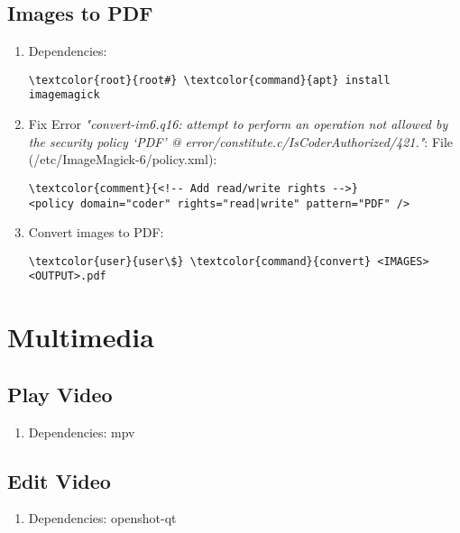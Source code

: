 \documentclass[10pt, a4paper, onecolumn, openany]{book} %
\begin{document}
\subsection{Images to PDF}
\begin{enumerate}
    \item Dependencies:
\begin{Verbatim}[commandchars=\\\{\}]
\textcolor{root}{root#} \textcolor{command}{apt} install imagemagick
\end{Verbatim}
    \item Fix Error \textit{"convert-im6.q16: attempt to perform an operation not allowed by the security policy `PDF' @ error/constitute.c/IsCoderAuthorized/421."}:
\newline File (\textcolor{file}{/etc/ImageMagick-6/policy.xml}):
\begin{Verbatim}[commandchars=\\\{\}]
\textcolor{comment}{<!-- Add read/write rights -->}
<policy domain="coder" rights="read|write" pattern="PDF" />
\end{Verbatim}
    \item Convert images to PDF:
\begin{Verbatim}[commandchars=\\\{\}]
\textcolor{user}{user\$} \textcolor{command}{convert} <IMAGES> <OUTPUT>.pdf
\end{Verbatim}
\end{enumerate}
\section{Multimedia}
\subsection{Play Video}
\begin{enumerate}
    \item Dependencies: mpv
\end{enumerate}
\subsection{Edit Video}
\begin{enumerate}
    \item Dependencies: openshot-qt
\end{enumerate}
\end{document}
